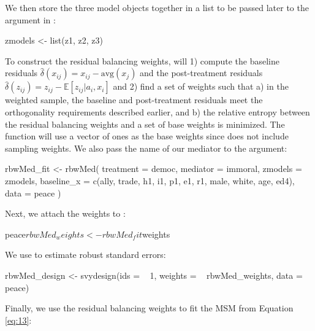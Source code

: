 We then store the three model objects together in a list to be passed
later to the  argument in :

\begin{Schunk}
\begin{Sinput}
zmodels <- list(z1, z2, z3)
\end{Sinput}
\end{Schunk}

To construct the residual balancing weights,  will 1)
compute the baseline residuals
\(\hat{\delta}(x_{ij})=x_{ij}-\text{avg}({x}_{j})\) and the
post-treatment residuals
\(\hat{\delta}(z_{ij})=z_{ij}-\mathbb{E}[z_{ij}|a_{i},x_{i}]\) and 2)
find a set of weights such that a) in the weighted sample, the baseline
and post-treatment residuals meet the orthogonality requirements
described earlier, and b) the relative entropy between the residual
balancing weights and a set of base weights is minimized. The function
will use a vector of ones as the base weights since  does
not include sampling weights. We also pass the name of our mediator to
the  argument:

\begin{Schunk}
\begin{Sinput}
rbwMed_fit <- rbwMed(
  treatment = democ,
  mediator = immoral,
  zmodels = zmodels,
  baseline_x = c(ally, trade, h1, i1,
                 p1, e1, r1, male, white, age, ed4),
  data = peace
)
\end{Sinput}
\end{Schunk}

Next, we attach the weights to :

\begin{Schunk}
\begin{Sinput}
peace$rbwMed_weights <- rbwMed_fit$weights
\end{Sinput}
\end{Schunk}

We use  to estimate robust standard errors:

\begin{Schunk}
\begin{Sinput}
rbwMed_design <- svydesign(ids = ~ 1,
                           weights = ~ rbwMed_weights,
                           data = peace)
\end{Sinput}
\end{Schunk}

Finally, we use the residual balancing weights to fit the MSM from
Equation \ref{eq:13}:

